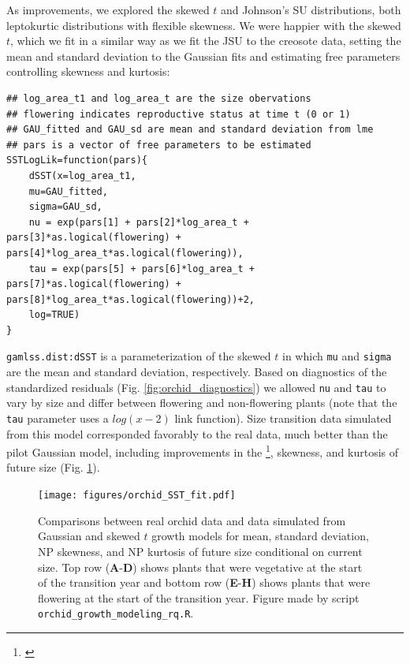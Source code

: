 \documentclass[12pt]{article}
\newcommand{\tom}[2]{{\color{red}{#1}}\footnote{\textit{\color{red}{#2}}}}
\begin{document}
As improvements, we explored the skewed $t$ and Johnson's SU distributions, both leptokurtic distributions with flexible skewness. 
We were happier with the skewed $t$, which we fit in a similar way as we fit the JSU to the creosote data, setting the mean and standard deviation to the Gaussian fits and estimating free parameters controlling skewness and kurtosis:
\begin{lstlisting}
## log_area_t1 and log_area_t are the size obervations
## flowering indicates reproductive status at time t (0 or 1)
## GAU_fitted and GAU_sd are mean and standard deviation from lme
## pars is a vector of free parameters to be estimated
SSTLogLik=function(pars){
	dSST(x=log_area_t1, 
	mu=GAU_fitted,
	sigma=GAU_sd,
	nu = exp(pars[1] + pars[2]*log_area_t + pars[3]*as.logical(flowering) + pars[4]*log_area_t*as.logical(flowering)),
	tau = exp(pars[5] + pars[6]*log_area_t + pars[7]*as.logical(flowering) + pars[8]*log_area_t*as.logical(flowering))+2, 
	log=TRUE)
}
\end{lstlisting}
\verb|gamlss.dist:dSST| is a parameterization of the skewed $t$ in which \verb|mu| and \verb|sigma| are the mean and standard deviation, respectively. 
Based on diagnostics of the standardized residuals (Fig. \ref{fig:orchid_diagnostics}) we allowed \verb|nu| and \verb|tau| to vary by size and differ between flowering and non-flowering plants (note that the \verb|tau| parameter uses a $log(x-2)$ link function). 
Size transition data simulated from this model corresponded favorably to the real data, much better than the pilot Gaussian model, including improvements in the \tom{standard deviation}{Again, the improvement here is suprising to me and I am unsure what to say about it. SPE: again, it's probably about the ``usual'' mean and SD versus the quantile-based NP versions.}, skewness, and kurtosis of future size (Fig. \ref{fig:orchid_SST_fit}). 

\begin{figure}[tbp]
	\centering
	\texttt{[image: figures/orchid\_SST\_fit.pdf]}
	\caption{Comparisons between real orchid data and data simulated from Gaussian and skewed $t$ growth models for mean, standard deviation, NP skewness, and NP kurtosis of future size conditional on current size. Top row (\textbf{A}-\textbf{D}) shows plants that were vegetative at the start of the transition year and bottom row (\textbf{E}-\textbf{H}) shows plants that were flowering at the start of the transition year. Figure made by script \texttt{orchid\_growth\_modeling\_rq.R}.}
	\label{fig:orchid_SST_fit}
\end{figure} 
\end{document}
